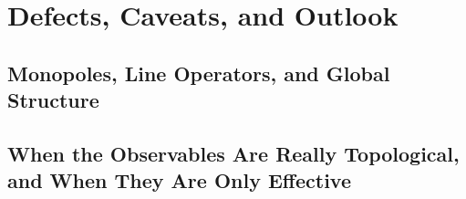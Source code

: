 \section{Defects, Caveats, and Outlook}
\label{sec:defects-caveats-outlook}


\subsection{Monopoles, Line Operators, and Global Structure}
\label{subsec:monopoles-line-operators}


\subsection{When the Observables Are Really Topological, and When They Are Only Effective}
\label{subsec:when-topological}

